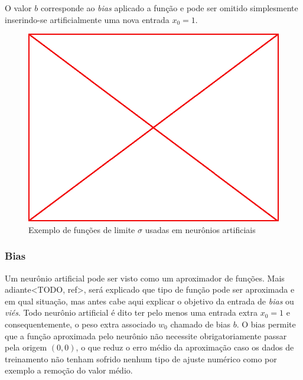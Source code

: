 O valor $b$ corresponde ao \emph{bias} aplicado a função e pode ser omitido
simplesmente inserindo-se artificialmente uma nova entrada $x_0 = 1$.

\begin{figure}
\label{fig:lim-fun}
  \caption{Exemplo de funções de limite $\sigma$ usadas em neurônios artificiais}
  \begin{center}
    \includegraphics[scale=0.5]{placeholder}
  \end{center}
\end{figure}

\subsubsection{Bias}

Um neurônio artificial pode ser visto como um aproximador de funções. Mais
adiante<TODO, ref>, será explicado que tipo de função pode ser aproximada e em
qual situação, mas antes cabe aqui explicar o objetivo da entrada de
\emph{bias} ou \emph{viés}. Todo neurônio artificial é dito ter pelo menos uma
entrada extra $x_0 = 1$ e consequentemente, o peso extra associado $w_0$
chamado de bias $b$. O bias permite que a função aproximada pelo neurônio não
necessite obrigatoriamente passar pela origem $(0,0)$, o que reduz o erro médio
da aproximação caso os dados de treinamento não tenham sofrido nenhum tipo de
ajuste numérico como por exemplo a remoção do valor médio.

